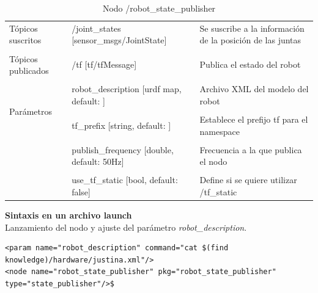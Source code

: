 \documentclass[user_manual.tex]{subfiles}
\begin{document}
\begin{table}[H]
\begin{center}
\begin{tabular}{|l|l|p{4cm}|}%
\hline

Tópicos suscritos &  /joint\_states [sensor\_msgs/JointState] & Se suscribe a la información de la posición de las juntas \\ 
& & \\
\hline

Tópicos publicados &  /tf [tf/tfMessage] & Publica el estado del robot \\
& & \\
\hline

\multirow{4}{*}{Parámetros} 
&  robot\_description [urdf map, default: ] & Archivo XML del modelo del robot \\
& & \\
& tf\_prefix [string, default: ]  & Establece el prefijo tf para el namespace\\
& & \\
& publish\_frequency [double, default: 50Hz] & Frecuencia a la que publica el nodo\\
& & \\
& use\_tf\_static [bool, default: false]  & Define si se quiere utilizar /tf\_static\\
\cline{1-3}

\end{tabular}
\caption{Nodo /robot\_state\_publisher}
\label{robot state publisher node}
\end{center}
\end{table}

\textbf{Sintaxis en un archivo launch}\\
Lanzamiento del nodo y ajuste del parámetro \textit{robot\_description}.
\begin{verbatim}
<param name="robot_description" command="cat $(find knowledge)/hardware/justina.xml"/>
<node name="robot_state_publisher" pkg="robot_state_publisher" type="state_publisher"/>$
\end{verbatim}
\end{document}
